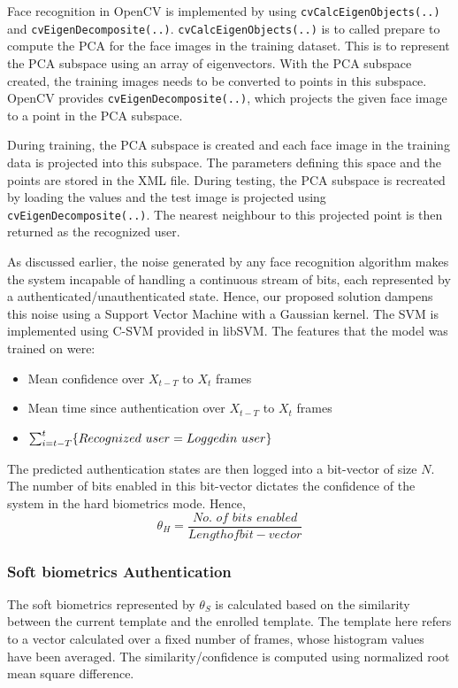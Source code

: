 \documentclass[12pt]{article}			%
\begin{document}
Face recognition in OpenCV is implemented by using \verb+cvCalcEigenObjects(..)+ and \verb+cvEigenDecomposite(..)+. 
\verb+cvCalcEigenObjects(..)+ is to called prepare to compute the PCA for the face images in the training dataset.
This is to represent the PCA subspace using an array of eigenvectors.
With the PCA subspace created, the training images needs to be converted to points in this subspace.
OpenCV provides \verb+cvEigenDecomposite(..)+, which projects the given face image to a point in the PCA subspace.

During training, the PCA subspace is created and each face image in the training data is projected into this subspace.
The parameters defining this space and the points are stored in the XML file.
During testing, the PCA subspace is recreated by loading the values and the test image is projected using \verb+cvEigenDecomposite(..)+.
The nearest neighbour to this projected point is then returned as the recognized user.

As discussed earlier, the noise generated by any face recognition algorithm makes the system incapable of handling a continuous stream of bits, each represented by a authenticated/unauthenticated state.
Hence, our proposed solution dampens this noise using a Support Vector Machine with a Gaussian kernel.
The SVM is implemented using C-SVM provided in libSVM\cite{libsvm}.
The features that the model was trained on were:
\begin{itemize}
	\item Mean confidence over $X_{t-T}$ to $X_{t}$ frames
	\item Mean time since authentication over $X_{t-T}$ to $X_{t}$ frames
	\item $\sum_{i=t-T}^{t}\{Recognized\ user = Logged\-in\ user\}$
\end{itemize}
The predicted authentication states are then logged into a bit-vector of size $N$.
The number of bits enabled in this bit-vector dictates the confidence of the system in the hard biometrics mode.
Hence,
\begin{equation}
\theta_{H} = \frac {\textit{No. of bits enabled}} {Length of bit-vector}
\end{equation}

\subsubsection{ Soft biometrics Authentication}

The soft biometrics represented by $\theta_{S}$ is calculated based on the similarity between the current template and the enrolled template.
The template here refers to a vector calculated over a fixed number of frames, whose histogram values have been averaged.
The similarity/confidence is computed using normalized root mean square difference.
\end{document}

